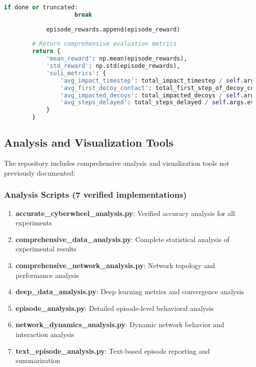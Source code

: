 \documentclass[12pt,a4paper]{article}
\begin{document}
\begin{lstlisting}[language=Python, caption=Core Trainer Implementation]
                if done or truncated:
                    break
            
            episode_rewards.append(episode_reward)
        
        # Return comprehensive evaluation metrics
        return {
            'mean_reward': np.mean(episode_rewards),
            'std_reward': np.std(episode_rewards),
            'suli_metrics': {
                'avg_impact_timestep': total_impact_timestep / self.args.eval_episodes,
                'avg_first_decoy_contact': total_first_step_of_decoy_contact / self.args.eval_episodes,
                'avg_impacted_decoys': total_impacted_decoys / self.args.eval_episodes,
                'avg_steps_delayed': total_steps_delayed / self.args.eval_episodes
            }
        }
\end{lstlisting}

\subsection{Analysis and Visualization Tools}

The repository includes comprehensive analysis and visualization tools not previously documented:

\subsubsection{Analysis Scripts (7 verified implementations)}
\begin{enumerate}
    \item \textbf{accurate\_cyberwheel\_analysis.py}: Verified accuracy analysis for all experiments
    \item \textbf{comprehensive\_data\_analysis.py}: Complete statistical analysis of experimental results
    \item \textbf{comprehensive\_network\_analysis.py}: Network topology and performance analysis  
    \item \textbf{deep\_data\_analysis.py}: Deep learning metrics and convergence analysis
    \item \textbf{episode\_analysis.py}: Detailed episode-level behavioral analysis
    \item \textbf{network\_dynamics\_analysis.py}: Dynamic network behavior and interaction analysis
    \item \textbf{text\_episode\_analysis.py}: Text-based episode reporting and summarization
\end{enumerate}
\end{document}
